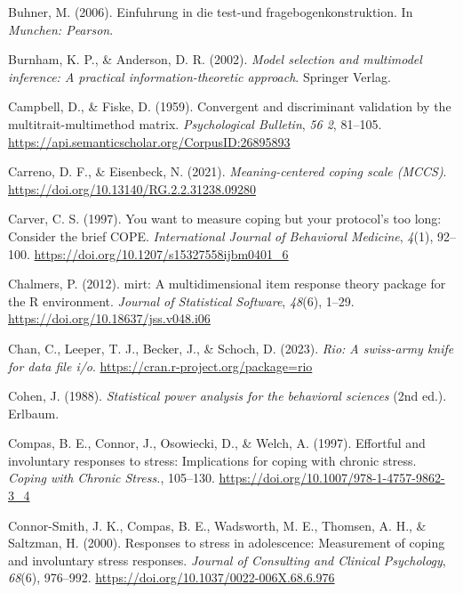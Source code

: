 \documentclass[
  man,floatsintext]{apa7}
\newlength{\cslhangindent}
\newenvironment{CSLReferences}[2] %
 {\begin{list}{}{%
  \setlength{\itemindent}{0pt}
  \setlength{\leftmargin}{0pt}
  \setlength{\parsep}{0pt}
  \ifodd #1
   \setlength{\leftmargin}{\cslhangindent}
   \setlength{\itemindent}{-1\cslhangindent}
  \fi
  \setlength{\itemsep}{#2\baselineskip}}}
 {\end{list}}
\begin{document}
\begin{CSLReferences}{1}{0}
Buhner, M. (2006). Einfuhrung in die test-und fragebogenkonstruktion. In \emph{Munchen: Pearson}.

Burnham, K. P., \& Anderson, D. R. (2002). \emph{Model selection and multimodel inference: A practical information-theoretic approach}. Springer Verlag.

Campbell, D., \& Fiske, D. (1959). Convergent and discriminant validation by the multitrait-multimethod matrix. \emph{Psychological Bulletin}, \emph{56 2}, 81--105. \url{https://api.semanticscholar.org/CorpusID:26895893}

Carreno, D. F., \& Eisenbeck, N. (2021). \emph{Meaning-centered coping scale (MCCS)}. \url{https://doi.org/10.13140/RG.2.2.31238.09280}

Carver, C. S. (1997). You want to measure coping but your protocol's too long: Consider the brief {COPE}. \emph{International Journal of Behavioral Medicine}, \emph{4}(1), 92--100. \url{https://doi.org/10.1207/s15327558ijbm0401_6}

Chalmers, P. (2012). {mirt}: A multidimensional item response theory package for the {R} environment. \emph{Journal of Statistical Software}, \emph{48}(6), 1--29. \url{https://doi.org/10.18637/jss.v048.i06}

Chan, C., Leeper, T. J., Becker, J., \& Schoch, D. (2023). \emph{Rio: A swiss-army knife for data file i/o}. \url{https://cran.r-project.org/package=rio}

Cohen, J. (1988). \emph{Statistical power analysis for the behavioral sciences} (2nd ed.). Erlbaum.

Compas, B. E., Connor, J., Osowiecki, D., \& Welch, A. (1997). Effortful and involuntary responses to stress: {Implications} for coping with chronic stress. \emph{Coping with Chronic Stress.}, 105--130. \url{https://doi.org/10.1007/978-1-4757-9862-3_4}

Connor-Smith, J. K., Compas, B. E., Wadsworth, M. E., Thomsen, A. H., \& Saltzman, H. (2000). Responses to stress in adolescence: {Measurement} of coping and involuntary stress responses. \emph{Journal of Consulting and Clinical Psychology}, \emph{68}(6), 976--992. \url{https://doi.org/10.1037/0022-006X.68.6.976}


\end{CSLReferences}
\end{document}
